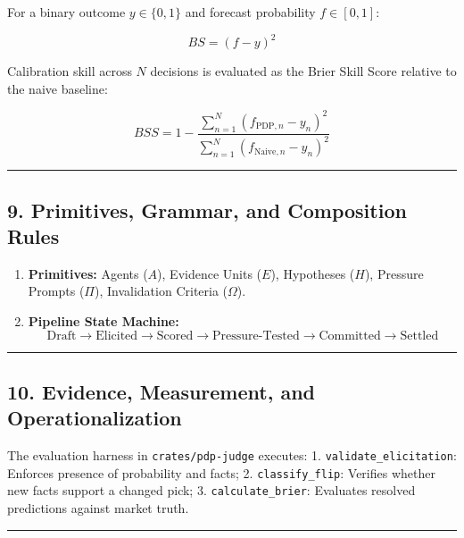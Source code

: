 \documentclass[
]{article}
\providecommand{\tightlist}{%
  \setlength{\itemsep}{0pt}\setlength{\parskip}{0pt}}
\begin{document}
For a binary outcome \(y \in \{0, 1\}\) and forecast probability
\(f \in [0, 1]\):

\[BS = (f - y)^2\]

Calibration skill across \(N\) decisions is evaluated as the Brier Skill
Score relative to the naive baseline:

\[BSS = 1 - \frac{\sum_{n=1}^N (f_{\text{PDP}, n} - y_n)^2}{\sum_{n=1}^N (f_{\text{Naive}, n} - y_n)^2}\]

\begin{center}\rule{0.5\linewidth}{0.5pt}\end{center}

\subsection{9. Primitives, Grammar, and Composition
Rules}\label{primitives-grammar-and-composition-rules}

\begin{enumerate}
\def\labelenumi{\arabic{enumi}.}
\tightlist
\item
  \textbf{Primitives:} Agents (\(A\)), Evidence Units (\(E\)),
  Hypotheses (\(H\)), Pressure Prompts (\(\Pi\)), Invalidation Criteria
  (\(\Omega\)).
\item
  \textbf{Pipeline State Machine:}
  \[\text{Draft} \longrightarrow \text{Elicited} \longrightarrow \text{Scored} \longrightarrow \text{Pressure-Tested} \longrightarrow \text{Committed} \longrightarrow \text{Settled}\]
\end{enumerate}

\begin{center}\rule{0.5\linewidth}{0.5pt}\end{center}

\subsection{10. Evidence, Measurement, and
Operationalization}\label{evidence-measurement-and-operationalization}

The evaluation harness in \texttt{crates/pdp-judge} executes: 1.
\texttt{validate\_elicitation}: Enforces presence of probability and
facts; 2. \texttt{classify\_flip}: Verifies whether new facts support a
changed pick; 3. \texttt{calculate\_brier}: Evaluates resolved
predictions against market truth.

\begin{center}\rule{0.5\linewidth}{0.5pt}\end{center}
\end{document}
